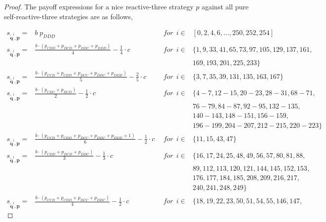\documentclass{article}
\theoremstyle{definition}
\begin{document}
\begin{proof}
  The payoff expressions for a nice reactive-three strategy $p$ against all
  pure self-reactive-three strategies are as follows,

\small{
\begin{equation}\label{Eq:PayoffExpressionsReactiveThree}
\begin{array}{lcll}
  s_{\mathbf{\tilde{q}}^{i}, \mathbf{p}} = & b \; p_{DDD} & ~~for~~ i \in & [0, 2, 4, 6, \dots, 250, 252, 254] \\ [0.1cm]
    s_{\mathbf{\tilde{q}}^{i}, \mathbf{p}} = & \frac{b \cdot (p_{CDD} + p_{DCD} + p_{DDC} + p_{DDD})}{4} - \frac{1}{4} \cdot c & ~~for~~ i \in & \{ 1, 9, 33, 41, 65, 73, 97, 105, 129, 137, 161,
    \\ & & &  169, 193, 201, 225, 233\} \\ [0.1cm]
    s_{\mathbf{\tilde{q}}^{i}, \mathbf{p}} = & \frac{b \cdot \left(p_{CCD} + p_{CDD} + p_{DCC} + p_{DDC} + p_{DDD}\right)}{5} - \frac{2}{5} \cdot c & ~~for~~ i \in & \{ 3, 7, 35, 39, 131, 135, 163, 167\} \\ [0.2cm]
    s_{\mathbf{\tilde{q}}^{i}, \mathbf{p}} = & \frac{b \cdot \left(p_{CDC} + p_{DCD}\right)}{2} - \frac{1}{2} \cdot c & ~~for~~ i \in & \{ 4 \!- \!7, 12 \!- \!15, 20 \!- \!23, 28 \!- \!31, 68 \!- \!71,
    \\ & & &  76 \!- \!79, 84 \!- \!87, 92 \!- \!95, 132 \!- \!135, 
    \\ & & & 140 \!- \!143, 148- 151, 156 \!- \!159, 
    \\ & & & 196 \!- \!199, 204 \!- \!207, 212 \!- \!215, 220 \!- \!223\} \\ 
    s_{\mathbf{\tilde{q}}^{i}, \mathbf{p}} = & \frac{b \cdot \left(p_{CCD} + p_{CDD} + p_{DCC} + p_{DDC} + p_{DDD} + 1\right)}{6} - \frac{1}{2} \cdot c & ~~for~~ i \in & \{ 11, 15, 43, 47\} \\ [0.2cm]
    s_{\mathbf{\tilde{q}}^{i}, \mathbf{p}} = & \frac{b \cdot \left(p_{CDD} + p_{DCD} + p_{DDC}\right)}{3} - \frac{1}{3} \cdot c & ~~for~~ i \in & \{ 16,17,24,25,48,49,56,57,80,81,88,
    \\ & & & 89,112, 113,120,121, 144,145,152,153,
    \\ & & & 176,177,184,185,208,209,216,217,
    \\ & & & 240, 241,248,249\} \\ 
    s_{\mathbf{\tilde{q}}^{i}, \mathbf{p}} = & \frac{b \cdot \left(p_{CCD} + p_{CDD} + p_{DCC} + p_{DDC}\right)}{4} - \frac{1}{2} \cdot c & ~~for~~ i \in & \{ 18, 19, 22, 23, 50, 51, 54, 55, 146, 147,

\end{array}
\end{equation}}
\end{proof}
\end{document}
